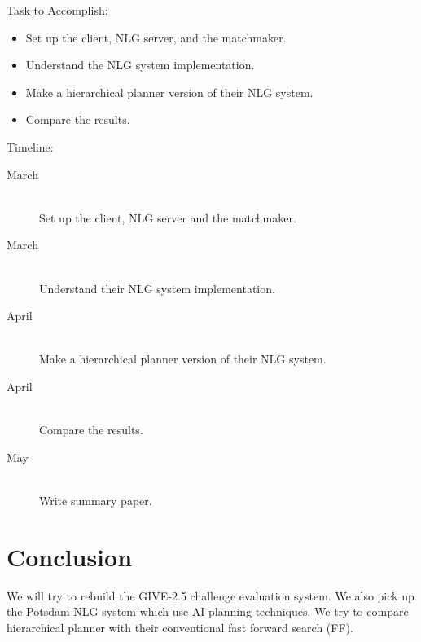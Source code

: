 \documentclass[11pt]{article} %
\begin{document}
Task to Accomplish:
\begin{itemize}
  \item Set up the client, NLG server, and the matchmaker.
  \item Understand the NLG system implementation.
  \item Make a hierarchical planner version of their NLG system.
  \item Compare the results.
\end{itemize}


\noindent
Timeline:

\begin{description}
  \item[March] \hfill \\
  Set up the client, NLG server and the matchmaker.
  \item[March] \hfill \\
  Understand their NLG system implementation.
  \item[April] \hfill \\
  Make a hierarchical planner version of their NLG system.
  \item[April] \hfill \\
  Compare the results.
  \item[May] \hfill \\
  Write summary paper.
\end{description}

\section{Conclusion}
We will try to rebuild the GIVE-2.5 challenge evaluation system.
We also pick up the Potsdam NLG system which use AI planning techniques.
We try to compare hierarchical planner with their conventional fast forward search (FF). 




\end{document}
